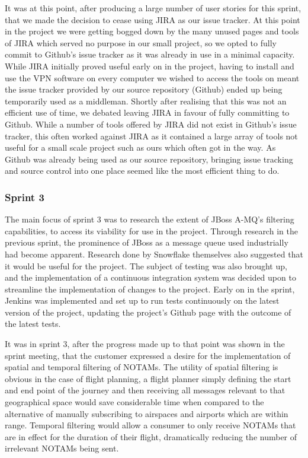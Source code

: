 \documentclass[a4paper, 12pt]{article}
\begin{document}
It was at this point, after producing a large number of user stories for this sprint, that we made the decision to cease using JIRA as our issue tracker. At this point in the project we were getting bogged down by the many unused pages and tools of JIRA which served no purpose in our small project, so we opted to fully commit to Github's issue tracker as it was already in use in a minimal capacity. While JIRA initially proved useful early on in the project, having to install and use the VPN software on every computer we wished to access the tools on meant the issue tracker provided by our source repository (Github) ended up being temporarily used as a middleman. Shortly after realising that this was not an efficient use of time, we debated leaving JIRA in favour of fully committing to Github. While a number of tools offered by JIRA did not exist in Github's issue tracker, this often worked against JIRA as it contained a large array of tools not useful for a small scale project such as ours which often got in the way. As Github was already being used as our source repository, bringing issue tracking and source control into one place seemed like the most efficient thing to do.

\subsubsection{Sprint 3}

The main focus of sprint 3 was to research the extent of JBoss A-MQ's filtering capabilities, to access its viability for use in the project. Through research in the previous sprint, the prominence of JBoss as a message queue used industrially had become apparent. Research done by Snowflake themselves also suggested that it would be useful for the project. The subject of testing was also brought up, and the implementation of a continuous integration system was decided upon to streamline the implementation of changes to the project. Early on in the sprint, Jenkins was implemented and set up to run tests continuously on the latest version of the project, updating the project's Github page with the outcome of the latest tests.

It was in sprint 3, after the progress made up to that point was shown in the sprint meeting, that the customer expressed a desire for the implementation of spatial and temporal filtering of NOTAMs. The utility of spatial filtering is obvious in the case of flight planning, a flight planner simply defining the start and end point of the journey and then receiving all messages relevant to that geographical space would save considerable time when compared to the alternative of manually subscribing to airspaces and airports which are within range. Temporal filtering would allow a consumer to only receive NOTAMs that are in effect for the duration of their flight, dramatically reducing the number of irrelevant NOTAMs being sent.
\end{document}
